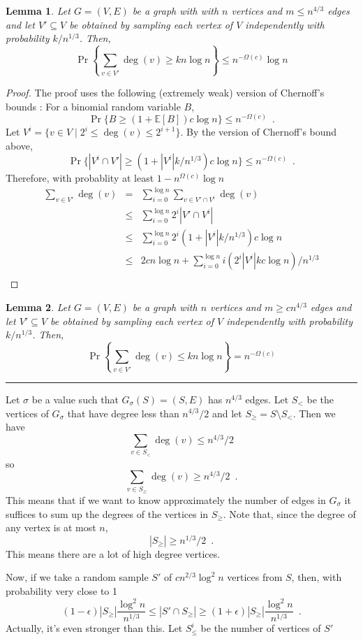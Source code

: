 \documentclass{article}
\newcommand{\E}{\mathbb{E}}
\newtheorem{lem}{Lemma}
\begin{document}
\begin{lem}
Let $G=(V,E)$ be a graph with with $n$ vertices and $m\le n^{4/3}$
edges and let $V'\subseteq V$ be obtained by sampling each vertex of
$V$ independently with probability $k/n^{1/3}$.  Then, 
\[
    \Pr\left\{\sum_{v\in V'}\deg(v) \ge kn\log n \right\} 
       		\le n^{-\Omega(c)}\log n
\]
\end{lem}

\begin{proof}
The proof uses the following (extremely weak) version of Chernoff's
bounds \cite{c52}:  For a binomial random variable $B$, 
\[  
     \Pr\{ B \ge (1+\E[B])c\log n \} \le n^{-\Omega(c)}  \enspace .
\]
Let $V^{i}=\{ v\in V \mid 2^i \le \deg(v) \le 2^{i+1}\}$.  By the
version of Chernoff's bound above,
\[
   \Pr\{ |V^{i}\cap V'| \ge (1+|V^{i}|k/n^{1/3})c\log n \} \le
n^{-\Omega(c)} \enspace .
\]
Therefore, with probablity at least $1-n^{\Omega(c)}\log n$
\begin{eqnarray*}
   \sum_{v\in V'} \deg(v)  
     & = & \sum_{i=0}^{\log n}\sum_{v\in V'\cap V^i} \deg(v) \\
     & \le & \sum_{i=0}^{\log n}2^i|V'\cap V^i| \\
     & \le & \sum_{i=0}^{\log n}2^i(1+|V^{i}|k/n^{1/3})c\log n \\
     & \le & 2cn\log n + \sum_{i=0}^{\log n}i(2^i|V^{i}|kc\log n) /n^{1/3} \\
\end{eqnarray*}
\end{proof}

\begin{lem}
Let $G=(V,E)$ be a graph with $n$ vertices and $m\ge cn^{4/3}$ edges
and let $V'\subseteq V$ be obtained by sampling each vertex of
$V$ independently with probability $k/n^{1/3}$.  Then, 
\[
    \Pr\left\{\sum_{v\in V'}\deg(v) \le kn\log n \right\} 
       		= n^{-\Omega(c)}
\]
\end{lem}





\rule{2mm}{2mm}
Let $\sigma$ be a value such that $G_\sigma(S)=(S,E)$ has $n^{4/3}$ edges.
Let $S_<$ be the vertices of $G_\sigma$ that have degree less than
$n^{4/3}/2$ and let $S_\ge=S\setminus S_<$.  Then we have
\[
     \sum_{v\in S_<}\deg(v) \le n^{4/3}/2
\]
so
\[
     \sum_{v\in S_\ge}\deg(v) \ge n^{4/3}/2 \enspace .
\]
This means that if we want to know approximately the number of edges
in $G_\sigma$ it suffices to sum up the degrees of the vertices in
$S_\ge$.  Note that, since the degree of any vertex is at most $n$,
\[
        |S_\ge| \ge n^{1/3}/2 \enspace .
\]
This means there are a lot of high degree vertices.

Now, if we take a random sample $S'$ of $cn^{2/3}\log^2 n$ vertices from $S$,
then, with probability very close to 1
\[
      (1-\epsilon)|S_\ge|\frac{\log^2 n}{n^{1/3}} 
	\le |S'\cap S_\ge| 
	\ge (1+\epsilon)|S_\ge|\frac{\log^2 n}{n^{1/3}} \enspace .
\]
Actually, it's even stronger than this.  Let $S^{i}_\le$ be the number
of vertices of $S'$
\end{document}
